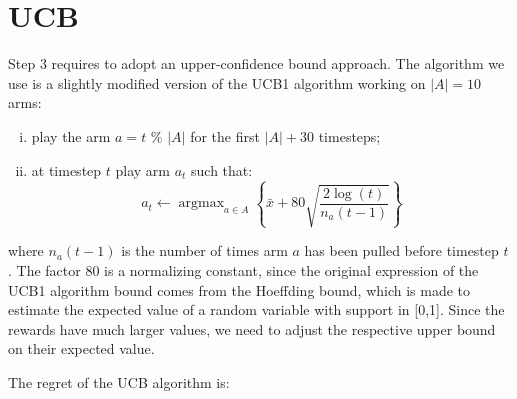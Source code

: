 \documentclass[12pt,a4paper]{report}
\DeclareMathOperator*{\argmax}{argmax}
\begin{document}
		\section{UCB}
Step 3 requires to adopt an upper-confidence bound approach. The algorithm we use is a slightly modified version of the UCB1 algorithm working on $|A|=10$ arms:
\begin{enumerate}[i)]
	\item play the arm $a=t$  $\%$  $|A|$ for the first $|A|+30$ timesteps;
	\item at timestep $t$ play arm $a_t$ such that:
		$$a_t \leftarrow \argmax_{a \in A} \left\{\bar x + 80 \sqrt{\frac{2 \log(t)}{n_a(t-1)}}\right\} $$
\end{enumerate}
where $n_a(t-1)$ is the number of times arm $a$ has been pulled before timestep $t$. The factor 80 is a normalizing constant, since the original expression of the UCB1 algorithm bound comes from the Hoeffding bound, which is made to estimate the expected value of a random variable with support in [0,1]. Since the rewards have much larger values, we need to adjust the respective upper bound on their expected value.

The regret of the UCB algorithm is: 
\end{document}
